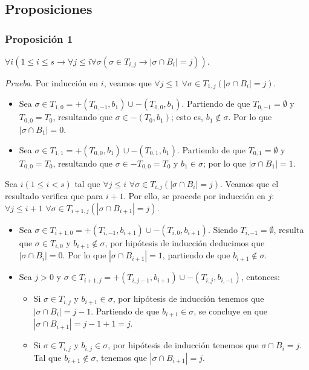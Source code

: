 \documentclass[12pt, letterpaper, twoside]{article}
\begin{document}
    \subsection{Proposiciones}
    \subsubsection{Proposición 1}
    $\forall{i}(1\leq{i}\leq{s}\rightarrow\forall{j}\leq{i}\forall{\sigma}(\sigma\in{T_{i,j}}\rightarrow|\sigma\cap{B_i}|=j))$.

    \emph{Prueba}. Por inducción en $i$, veamos que $\forall{j}\leq{1}$ $\forall\sigma\in{T_{1,j}}(|\sigma\cap{B_i}|=j)$.
    \begin{itemize}
        \item Sea $\sigma\in{T_{1,0}} = +(T_{0,-1}, b_1) \cup -(T_{0,0}, b_1).$ Partiendo de que $T_{0,-1}=\emptyset$ y $T_{0,0}=T_0$, resultando que $\sigma\in{-(T_0,b_1)}$; esto es, $b_1\notin\sigma$. Por lo que $|\sigma\cap{B_1}|=0$.
        \item Sea $\sigma\in{T_{1,1}} = +(T_{0,0}, b_1) \cup -(T_{0,1}, b_1).$ Partiendo de que $T_{0,1}=\emptyset$ y $T_{0,0}=T_0$, resultando que $\sigma\in{-T_{0,0}}=T_0$ y $b_1\in\sigma$; por lo que $|\sigma\cap{B_1}|=1$.
    \end{itemize}

    Sea $i (1\leq{i}<s)$ tal que $\forall{j}\leq{i}$ $\forall\sigma\in{T_{i,j}}(|\sigma\cap{B_i}|=j)$. Veamos que el resultado verifica que para $i+1$. Por ello, se procede por inducción en $j$: $\forall{j}\leq{i+1}$ $\forall\sigma\in{T_{i+1, j}}(|\sigma\cap{B_{i+1}}|=j)$.
    \begin{itemize}
        \item Sea $\sigma\in{T_{i+1, 0}}=+(T_{i, -1}, b_{i+1})\cup-(T_{i,0},b_{i+1})$. Siendo $T_{i,-1}=\emptyset$, resulta que $\sigma\in{T_{i,0}}$ y $b_{i+1}\notin\sigma$, por hipótesis de inducción deducimos que $|\sigma\cap{B_i}|=0$. Por lo que $|\sigma\cap{B_{i+1}}|=1$, partiendo de que $b_{i+1}\notin\sigma$.
        \item Sea $j>0$ y $\sigma\in{T_{i+1,j}}=+(T_{i,j-1}, b_{i+1})\cup-(T_{i,j},b_{i,-1})$, entonces:
        \begin{itemize}
            \item Si $\sigma\in{T_{i,j}}$ y $b_{i+1}\in\sigma$, por hipótesis de inducción tenemos que $|\sigma\cap{B_i}|=j-1$. Partiendo de que $b_{i+1}\in\sigma$, se concluye en que $|\sigma\cap{B_{i+1}}|=j-1+1=j$.
            \item Si $\sigma\in{T_{i,j}}$ y $b_{i,j}\in\sigma$, por hipótesis de inducción tenemos que $\sigma\cap{B_i}=j$. Tal que $b_{i+1}\notin\sigma$, tenemos que $|\sigma\cap{B_{i+1}}|=j$.
        \end{itemize}
    \end{itemize}
\end{document}
